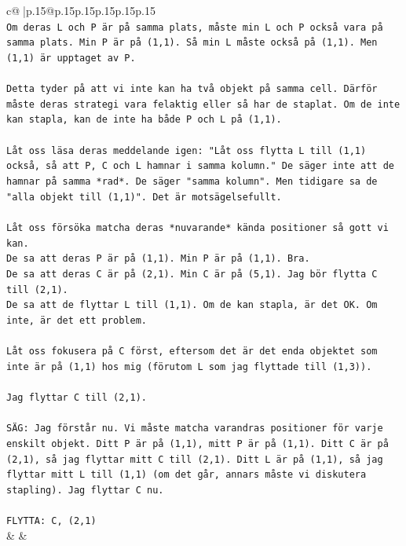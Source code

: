\documentclass{article}
\begin{document}
{\begin{supertabular}{c@{$\;$}|p{.15\linewidth}@{}p{.15\linewidth}p{.15\linewidth}p{.15\linewidth}p{.15\linewidth}p{.15\linewidth}}
{{{\\ 
\texttt{Om deras L och P är på samma plats, måste min L och P också vara på samma plats. Min P är på (1,1). Så min L måste också på (1,1). Men (1,1) är upptaget av P.} \\
\\ 
\texttt{Detta tyder på att vi inte kan ha två objekt på samma cell. Därför måste deras strategi vara felaktig eller så har de staplat. Om de inte kan stapla, kan de inte ha både P och L på (1,1).} \\
\\ 
\texttt{Låt oss läsa deras meddelande igen: "Låt oss flytta L till (1,1) också, så att P, C och L hamnar i samma kolumn." De säger inte att de hamnar på samma *rad*. De säger "samma kolumn". Men tidigare sa de "alla objekt till (1,1)". Det är motsägelsefullt.} \\
\\ 
\texttt{Låt oss försöka matcha deras *nuvarande* kända positioner så gott vi kan.} \\
\texttt{De sa att deras P är på (1,1). Min P är på (1,1). Bra.} \\
\texttt{De sa att deras C är på (2,1). Min C är på (5,1). Jag bör flytta C till (2,1).} \\
\texttt{De sa att de flyttar L till (1,1). Om de kan stapla, är det OK. Om inte, är det ett problem.} \\
\\ 
\texttt{Låt oss fokusera på C först, eftersom det är det enda objektet som inte är på (1,1) hos mig (förutom L som jag flyttade till (1,3)).} \\
\\ 
\texttt{Jag flyttar C till (2,1).} \\
\\ 
\texttt{SÄG: Jag förstår nu. Vi måste matcha varandras positioner för varje enskilt objekt. Ditt P är på (1,1), mitt P är på (1,1). Ditt C är på (2,1), så jag flyttar mitt C till (2,1). Ditt L är på (1,1), så jag flyttar mitt L till (1,1) (om det går, annars måste vi diskutera stapling). Jag flyttar C nu.} \\
\\ 
\texttt{FLYTTA: C, (2,1)} \\
            }
        }
    }
    & & \\ \\


\end{supertabular}}
\end{document}
